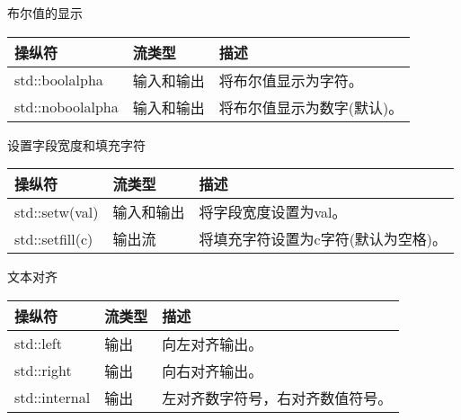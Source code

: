\begin{center}
布尔值的显示
\end{center}

\begin{longtable}[c]{|l|l|l|}
\hline
\textbf{操纵符} & \textbf{流类型} & \textbf{描述}                       \\ \hline
\endfirsthead
%
\endhead
%
std::boolalpha       & 输入和输出     & 将布尔值显示为字符。            \\ \hline
std::noboolalpha     & 输入和输出     & 将布尔值显示为数字(默认)。 \\ \hline
\end{longtable}

\begin{center}
设置字段宽度和填充字符
\end{center}

\begin{longtable}[c]{|l|l|l|}
\hline
\textbf{操纵符} & \textbf{流类型} & \textbf{描述}                            \\ \hline
\endfirsthead
%
\endhead
%
std::setw(val)       & 输入和输出     & 将字段宽度设置为val。                    \\ \hline
std::setfill(c)      & 输出流        & 将填充字符设置为c字符(默认为空格)。 \\ \hline
\end{longtable}

\begin{center}
文本对齐
\end{center}

\begin{longtable}[c]{|l|l|l|}
\hline
\textbf{操纵符} & \textbf{流类型} & \textbf{描述}                                \\ \hline
\endfirsthead
%
\endhead
%
std::left            & 输出               & 向左对齐输出。                             \\ \hline
std::right           & 输出               & 向右对齐输出。                            \\ \hline
std::internal        & 输出               & 左对齐数字符号，右对齐数值符号。 \\ \hline
\end{longtable}

